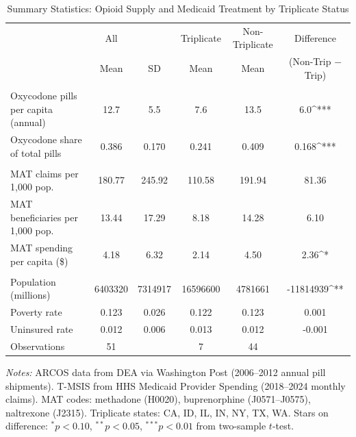 \begin{table}[t]
\centering
\caption{Summary Statistics: Opioid Supply and Medicaid Treatment by Triplicate Status}
\label{tab:summary}
\small
\begin{adjustbox}{max width=\textwidth}
\begin{tabular}{lccccc}
\hline\hline
 & All & & Triplicate & Non-Triplicate & Difference \\
 & Mean & SD & Mean & Mean & (Non-Trip $-$ Trip) \\
\hline
\addlinespace
\multicolumn{6}{l}{\textit{Panel A: Opioid Supply (ARCOS, 2006--2012 avg.)}} \\
\addlinespace
Oxycodone pills per capita (annual) & 12.7 & 5.5 & 7.6 & 13.5 & 6.0^{***} \\
Oxycodone share of total pills & 0.386 & 0.170 & 0.241 & 0.409 & 0.168^{***} \\
\addlinespace
\multicolumn{6}{l}{\textit{Panel B: Medicaid MAT Treatment (T-MSIS, 2018--2024 avg.)}} \\
\addlinespace
MAT claims per 1,000 pop. & 180.77 & 245.92 & 110.58 & 191.94 & 81.36 \\
MAT beneficiaries per 1,000 pop. & 13.44 & 17.29 & 8.18 & 14.28 & 6.10 \\
MAT spending per capita (\$) & 4.18 & 6.32 & 2.14 & 4.50 & 2.36^{*} \\
\addlinespace
\multicolumn{6}{l}{\textit{Panel C: State Characteristics}} \\
\addlinespace
Population (millions) & 6403320 & 7314917 & 16596600 & 4781661 & -11814939^{**} \\
Poverty rate & 0.123 & 0.026 & 0.122 & 0.123 & 0.001 \\
Uninsured rate & 0.012 & 0.006 & 0.013 & 0.012 & -0.001 \\
\addlinespace
\hline
Observations & 51 & & 7 & 44 & \\
\hline\hline
\end{tabular}
\end{adjustbox}
\begin{tablenotes}
\item \textit{Notes:} ARCOS data from DEA via Washington Post (2006--2012 annual pill shipments). T-MSIS from HHS Medicaid Provider Spending (2018--2024 monthly claims). MAT codes: methadone (H0020), buprenorphine (J0571--J0575), naltrexone (J2315). Triplicate states: CA, ID, IL, IN, NY, TX, WA. Stars on difference: $^{*}p<0.10$, $^{**}p<0.05$, $^{***}p<0.01$ from two-sample $t$-test.
\end{tablenotes}
\end{table}
